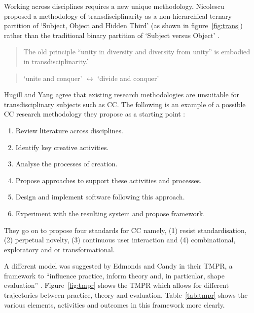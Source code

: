 Working across disciplines requires a new unique methodology. Nicolescu proposed a methodology of transdisciplinarity as a non-hierarchical ternary partition of `Subject, Object and Hidden Third' (as shown in figure~\ref{fig:trans}) rather than the traditional binary partition of `Subject versus Object' \autocite*{Nicolescu2010}.

\begin{quotation}
  The old principle ``unity in diversity and diversity from unity'' is embodied in transdisciplinarity.' 
\end{quotation}

\begin{quotation}
  `unite and conquer' $\longleftrightarrow$ `divide and conquer' 
\end{quotation}

Hugill and Yang agree that existing research methodologies are unsuitable for transdisciplinary subjects such as \acf{CC}. The following is an example of a possible \ac{CC} research methodology they propose as a starting point \autocite{Hugill2013c}:

\begin{enumerate}
  \item Review literature across disciplines.
  \item Identify key creative activities.
  \item Analyse the processes of creation.
  \item Propose approaches to support these activities and processes.
  \item Design and implement software following this approach.
  \item Experiment with the resulting system and propose framework.
\end{enumerate}

They go on to propose four standards for \ac{CC} \autocite{Hugill2013c} namely, (1) resist standardisation, (2) perpetual novelty, (3) continuous user interaction and (4) combinational, exploratory and or transformational.

A different model was suggested by Edmonds and Candy in their \ac{TMPR}, a framework to ``influence practice, inform theory and, in particular, shape evaluation'' \autocite*{Edmonds2010}. Figure~\ref{fig:tmpr} shows the \ac{TMPR} which allows for different trajectories between practice, theory and evaluation. Table~\ref{tab:tmpr} shows the various elements, activities and outcomes in this framework more clearly.

